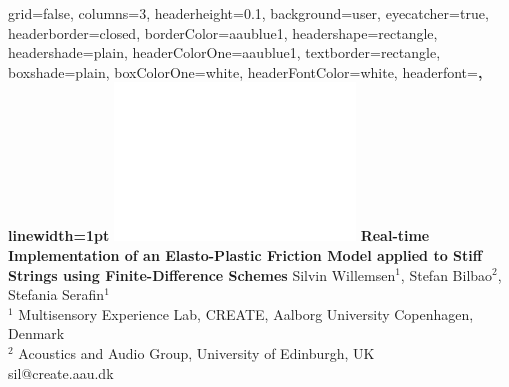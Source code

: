 \documentclass[a0paper,portrait]{baposter}
\let\oldtext\text
\renewcommand{\text}[1]{\oldtext{\fontfamily{ptm}\selectfont #1}}
\begin{document}
\begin{poster}{
  grid=false,
  columns=3,
  headerheight=0.1\textheight,
  background=user,
  eyecatcher=true,
  headerborder=closed,
  borderColor=aaublue1,
  headershape=rectangle,
  headershade=plain,
  headerColorOne=aaublue1,
  textborder=rectangle,
  boxshade=plain,
  boxColorOne=white,
  headerFontColor=white,
  headerfont=\Large\sf\bf,
  linewidth=1pt
}
{
  \includegraphics[height=0.75\headerheight]{AAUgraphics/aau_logo_new_neg}
}
{\color{white}\bf \Large
  Real-time Implementation of an Elasto-Plastic Friction Model applied to Stiff Strings using Finite-Difference Schemes
}
{\color{white}\small
  \vspace{1em} Silvin Willemsen$^\oldtext{1}$, Stefan Bilbao$^\oldtext{2}$, Stefania Serafin$^\oldtext{1}$\\[0.5em]
  $^\oldtext{1}$ Multisensory Experience Lab, CREATE, Aalborg University Copenhagen, Denmark\\
  $^\oldtext{2}$ Acoustics and Audio Group, University of Edinburgh, UK \\
  sil@create.aau.dk
}
{
}
\end{poster}
\end{document}
